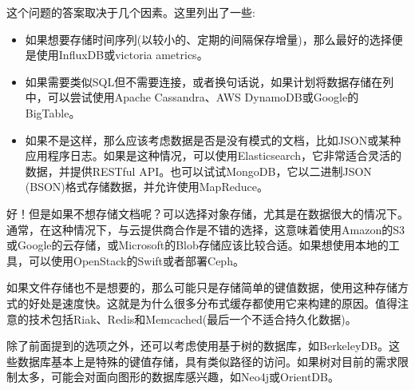 

这个问题的答案取决于几个因素。这里列出了一些:

\begin{itemize}
\item 
如果想要存储时间序列(以较小的、定期的间隔保存增量)，那么最好的选择便是使用InfluxDB或victoria ametrics。

\item
如果需要类似SQL但不需要连接，或者换句话说，如果计划将数据存储在列中，可以尝试使用Apache Cassandra、AWS DynamoDB或Google的BigTable。

\item
如果不是这样，那么应该考虑数据是否是没有模式的文档，比如JSON或某种应用程序日志。如果是这种情况，可以使用Elasticsearch，它非常适合灵活的数据，并提供RESTful API。也可以试试MongoDB，它以二进制JSON (BSON)格式存储数据，并允许使用MapReduce。
\end{itemize}

好！但是如果不想存储文档呢？可以选择对象存储，尤其是在数据很大的情况下。通常，在这种情况下，与云提供商合作是不错的选择，这意味着使用Amazon的S3或Google的云存储，或Microsoft的Blob存储应该比较合适。如果想使用本地的工具，可以使用OpenStack的Swift或者部署Ceph。

如果文件存储也不是想要的，那么可能只是存储简单的键值数据，使用这种存储方式的好处是速度快。这就是为什么很多分布式缓存都使用它来构建的原因。值得注意的技术包括Riak、Redis和Memcached(最后一个不适合持久化数据)。

除了前面提到的选项之外，还可以考虑使用基于树的数据库，如BerkeleyDB。这些数据库基本上是特殊的键值存储，具有类似路径的访问。如果树对目前的需求限制太多，可能会对面向图形的数据库感兴趣，如Neo4j或OrientDB。







